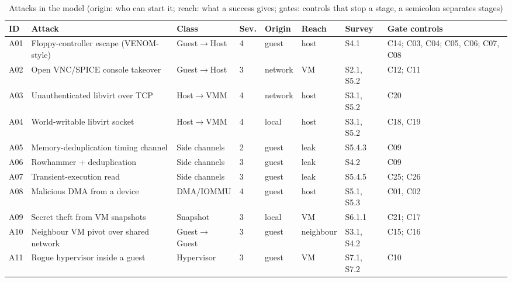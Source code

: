 \documentclass[conference]{IEEEtran}
\begin{document}
\begin{table}[!t]
\caption{Attacks in the model (origin: who can start it; reach: what a success gives; gates: controls that stop a stage, a semicolon separates stages)}
\label{tab:attacks}
\centering\footnotesize
\begin{tabular}{@{}llllllll@{}}
\toprule
ID & Attack & Class & Sev. & Origin & Reach & Survey & Gate controls \\
\midrule
A01 & Floppy-controller escape (VENOM-style) & Guest$\to$Host & 4 & guest & host & S4.1 & C14; C03, C04; C05, C06; C07, C08 \\
A02 & Open VNC/SPICE console takeover & Guest$\to$Host & 3 & network & VM & S2.1, S5.2 & C12; C11 \\
A03 & Unauthenticated libvirt over TCP & Host$\to$VMM & 4 & network & host & S3.1, S5.2 & C20 \\
A04 & World-writable libvirt socket & Host$\to$VMM & 4 & local & host & S3.1, S5.2 & C18, C19 \\
A05 & Memory-deduplication timing channel & Side channels & 2 & guest & leak & S5.4.3 & C09 \\
A06 & Rowhammer + deduplication & Side channels & 3 & guest & leak & S4.2 & C09 \\
A07 & Transient-execution read & Side channels & 3 & guest & leak & S5.4.5 & C25; C26 \\
A08 & Malicious DMA from a device & DMA/IOMMU & 4 & guest & host & S5.1, S5.3 & C01, C02 \\
A09 & Secret theft from VM snapshots & Snapshot & 3 & local & VM & S6.1.1 & C21; C17 \\
A10 & Neighbour VM pivot over shared network & Guest$\to$Guest & 3 & guest & neighbour & S3.1, S4.2 & C15; C16 \\
A11 & Rogue hypervisor inside a guest & Hypervisor & 3 & guest & VM & S7.1, S7.2 & C10 \\
\bottomrule
\end{tabular}
\end{table}
\end{document}
